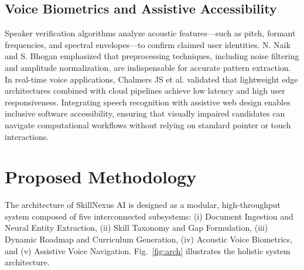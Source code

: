 \documentclass[conference]{IEEEtran}
\begin{document}
\subsection{Voice Biometrics and Assistive Accessibility}
Speaker verification algorithms analyze acoustic features—such as pitch, formant frequencies, and spectral envelopes—to confirm claimed user identities. N. Naik and S. Bhogan \cite{naik2024machine} emphasized that preprocessing techniques, including noise filtering and amplitude normalization, are indispensable for accurate pattern extraction. In real-time voice applications, Chalmers JS et al. \cite{chalmers2024leafyogi} validated that lightweight edge architectures combined with cloud pipelines achieve low latency and high user responsiveness. Integrating speech recognition with assistive web design enables inclusive software accessibility, ensuring that visually impaired candidates can navigate computational workflows without relying on standard pointer or touch interactions.

\section{Proposed Methodology}
The architecture of SkillNexus AI is designed as a modular, high-throughput system composed of five interconnected subsystems: (i) Document Ingestion and Neural Entity Extraction, (ii) Skill Taxonomy and Gap Formulation, (iii) Dynamic Roadmap and Curriculum Generation, (iv) Acoustic Voice Biometrics, and (v) Assistive Voice Navigation. Fig.~\ref{fig:arch} illustrates the holistic system architecture.
\end{document}
